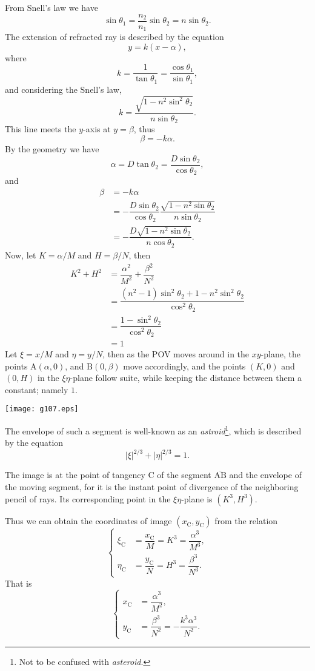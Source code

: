 \documentclass[twocolumn]{article}
\begin{document}
From Snell's law we have
$$ \sin\theta_1 = \frac{n_2}{n_1} \sin\theta_2 = n\sin\theta_2.$$
The extension of refracted ray is described by the equation 
$$y=k(x-\alpha),$$
where 
$$k=\dfrac{1}{\tan\theta_1}=\dfrac{\cos\theta_1}{\sin\theta_1},$$
and considering the Snell's law,
$$k=\dfrac{\sqrt{1-n^2\sin^2\theta_2}}{n\sin\theta_2}.$$
This line meets the $y$-axis at $y=\beta$, thus
$$\beta = -k\alpha.$$
By the geometry we have
$$\alpha = D\tan\theta_2 = \dfrac{D\sin\theta_2}{\cos\theta_2},$$
and
$$\begin{aligned}
	\beta &= -k\alpha \\
	&= -\dfrac{D\sin\theta_2}{\cos\theta_2}
	\dfrac{\sqrt{1-n^2\sin\theta_2}}{n\sin\theta_2}\\
	&=-\dfrac{D\sqrt{1-n^2\sin\theta_2}}{n\cos\theta_2}.
\end{aligned}$$
Now, let $K=\alpha/M$ and $H=\beta/N$, then
$$ \begin{aligned}
	K^2 + H^2 &= \dfrac{\alpha^2}{M^2}+\dfrac{\beta^2}{N^2}\\
	&=\dfrac{\left(n^2-1\right)\sin^2\theta_2 + 1-n^2\sin^2\theta_2}
	{\cos^2\theta_2}\\
	&=\dfrac{1-\sin^2\theta_2}{\cos^2\theta_2}\\
	&=1
\end{aligned}$$
Let $\xi=x/M$ and $\eta=y/N$, then as the POV moves around in the $xy$-plane,
the points $\mathrm{A}(\alpha, 0)$, and $\mathrm{B}(0, \beta)$ move accordingly,  
and the points $(K, 0)$ and $(0, H)$ in the $\xi\eta$-plane follow suite, 
while keeping the distance between them a constant; namely $1$.

\texttt{[image: g107.eps]}

The envelope of such a segment is well-known as an \emph{astroid}\footnote{Not 
to be confused with {\emph{asteroid}}.}, which is described by the 
equation
$$ \left| \xi \right|^{2/3} + \left| \eta \right|^{2/3} = 1. $$

The image is at the point of tangency $\mathrm{C}$ of the segment 
$\overline{\mathrm{AB}}$ and the envelope of the moving segment, for 
it is the instant point of divergence of the neighboring pencil of rays.
Its corresponding point in the $\xi\eta$-plane is $(K^3, H^3)$.

Thus we can obtain the coordinates of image $(x_{\mathrm{C}}^{}, y_{\mathrm{C}}^{})$ 
from the relation
$$ \left\{ 
\begin{aligned}
	\xi_{\mathrm{C}}^{} &= \dfrac{x_{\mathrm{C}}^{}}{M} = K^3 = \dfrac{\alpha^3}{M^3},\\
	\eta_{\mathrm{C}}^{} &= \dfrac{y_{\mathrm{C}}^{}}{N} = H^3 = \dfrac{\beta^3}{N^3}.
\end{aligned}
\right.$$
That is
$$ \left\{ 
\begin{aligned}
	x_{\mathrm{C}}^{} &= \dfrac{\alpha^3}{M^2},\\
	y_{\mathrm{C}}^{} &= \dfrac{\beta^3}{N^2}=-\dfrac{k^3\alpha^3}{N^2}.
\end{aligned}
\right.$$
\end{document}
